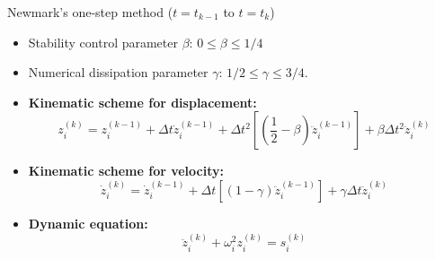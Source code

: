 \documentclass[aspectratio=169]{beamer}
\begin{document}
{
\color{white}
\begin{frame}{Newmark's one-step method ($t=t_{k-1}$ to $t=t_{k}$)}
  \begin{itemize}
    \item[] Stability control parameter \(\beta\): \( 0 \leq \beta \leq 1/4 \)
    \item[] Numerical dissipation parameter \(\gamma\): \( 1/2 \leq \gamma \leq 3/4\).
  \end{itemize}
  \begin{itemize}
    \item \textbf{Kinematic scheme for displacement:}
          $${z}_i^{(k)}={z}_i^{(k-1)}+\Delta t \dot{z}_i^{(k-1)}+\Delta t^2 \left[ \left( \frac{1}{2} - \beta \right) \ddot{z}_i^{(k-1)}\right]+\beta\Delta t^2  \ddot{z}_i^{(k)}$$

    \item \textbf{Kinematic scheme for velocity:}
          $$\dot{z}_i^{(k)}=\dot{z}_i^{(k-1)}+\Delta t \left[ \left( 1-\gamma \right) \ddot{z}_i^{(k-1)}\right]+\gamma\Delta t  \ddot{z}_i^{(k)}$$
    \item \textbf{Dynamic equation:}
          $$\ddot{z}_i^{(k)} + \omega_{i}^2 z_i^{(k)}  = s_{i}^{(k)}$$
  \end{itemize}
\end{frame}
}
\end{document}

